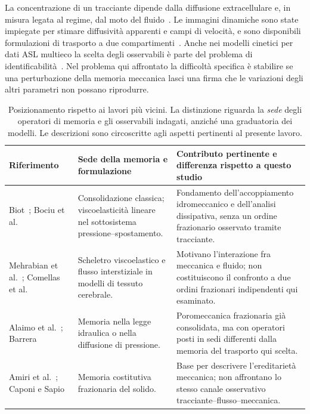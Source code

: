 La concentrazione di un tracciante dipende dalla diffusione extracellulare e, in misura legata al regime, dal moto del fluido~\citep{sykov2008diffusion,ray2019analysis,alcaide2023solute}. Le immagini dinamiche sono state impiegate per stimare diffusività apparenti e campi di velocità, e sono disponibili formulazioni di trasporto a due compartimenti~\citep{valnes2020apparent,toscano2026mraiv,riseth2025twocompartment}. Anche nei modelli cinetici per dati ASL multieco la scelta degli osservabili è parte del problema di identificabilità~\citep{manson2025on}. Nel problema qui affrontato la difficoltà specifica è stabilire se una perturbazione della memoria meccanica lasci una firma che le variazioni degli altri parametri non possano riprodurre.

\begin{table}[H]
\centering\footnotesize
\caption{Posizionamento rispetto ai lavori più vicini. La distinzione riguarda la \emph{sede} degli operatori di memoria e gli osservabili indagati, anziché una graduatoria dei modelli. Le descrizioni sono circoscritte agli aspetti pertinenti al presente lavoro.}
\label{tab:literature-positioning}
\setlength{\tabcolsep}{4.0pt}
\renewcommand{\arraystretch}{1.13}
\begin{tabularx}{\textwidth}{@{}>{\raggedright\arraybackslash}p{}>{\raggedright\arraybackslash}p{}>{\raggedright\arraybackslash}X@{}}
\toprule
Riferimento & Sede della memoria e formulazione & Contributo pertinente e differenza rispetto a questo studio\\
\midrule
Biot~\citep{biot1941general}; Bociu et al.~\citep{bociu2023mathematical} & Consolidazione classica; viscoelasticità lineare nel sottosistema pressione--spostamento. & Fondamento dell'accoppiamento idromeccanico e dell'analisi dissipativa, senza un ordine frazionario osservato tramite tracciante.\\
Mehrabian et al.~\citep{mehrabian2015dual}; Comellas et al.~\citep{comellas2020modeling} & Scheletro viscoelastico e flusso interstiziale in modelli di tessuto cerebrale. & Motivano l'interazione fra meccanica e fluido; non costituiscono il confronto a due ordini frazionari indipendenti qui esaminato.\\
Alaimo et al.~\citep{alaimo2019a}; Barrera~\citep{barrera2021unified} & Memoria nella legge idraulica o nella diffusione di pressione. & Poromeccanica frazionaria già consolidata, ma con operatori posti in sedi differenti dalla memoria del trasporto qui scelta.\\
Amiri et al.~\citep{amiri2023fractionalorder}; Caponi e Sapio~\citep{caponi2021sapio} & Memoria costitutiva frazionaria del solido. & Base per descrivere l'ereditarietà meccanica; non affrontano lo stesso canale osservativo tracciante--flusso--meccanica.\\

\end{tabularx}
\end{table}
